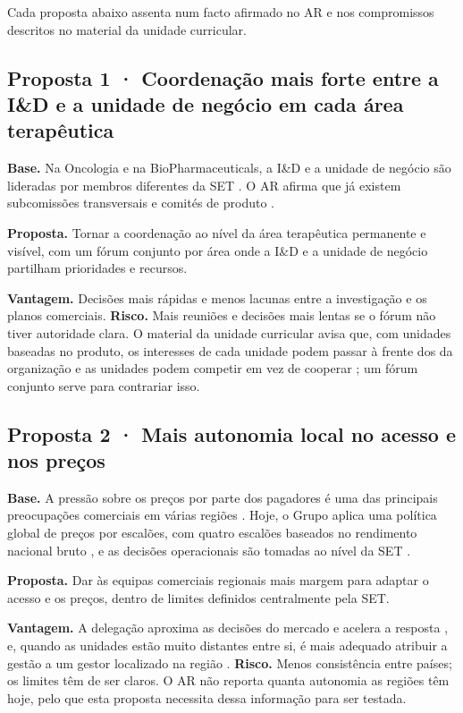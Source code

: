 Cada proposta abaixo assenta num facto afirmado no AR e nos compromissos descritos no material da unidade curricular.

\subsection{Proposta 1 · Coordenação mais forte entre a I\&D e a unidade de negócio em cada área terapêutica}

\textbf{Base.} Na Oncologia e na BioPharmaceuticals, a I\&D e a unidade de negócio são lideradas por membros diferentes da SET \cite[p.~70]{AR}. O AR afirma que já existem subcomissões transversais e comités de produto \cite[p.~147]{AR}.

\textbf{Proposta.} Tornar a coordenação ao nível da área terapêutica permanente e visível, com um fórum conjunto por área onde a I\&D e a unidade de negócio partilham prioridades e recursos.

\textbf{Vantagem.} Decisões mais rápidas e menos lacunas entre a investigação e os planos comerciais. \textbf{Risco.} Mais reuniões e decisões mais lentas se o fórum não tiver autoridade clara. O material da unidade curricular avisa que, com unidades baseadas no produto, os interesses de cada unidade podem passar à frente dos da organização e as unidades podem competir em vez de cooperar \cite[p.~17]{ORG}; um fórum conjunto serve para contrariar isso.

\subsection{Proposta 2 · Mais autonomia local no acesso e nos preços}

\textbf{Base.} A pressão sobre os preços por parte dos pagadores é uma das principais preocupações comerciais em várias regiões \cite[p.~32]{AR}. Hoje, o Grupo aplica uma política global de preços por escalões, com quatro escalões baseados no rendimento nacional bruto \cite[p.~41]{AR}, e as decisões operacionais são tomadas ao nível da SET \cite[p.~147]{AR}.

\textbf{Proposta.} Dar às equipas comerciais regionais mais margem para adaptar o acesso e os preços, dentro de limites definidos centralmente pela SET.

\textbf{Vantagem.} A delegação aproxima as decisões do mercado e acelera a resposta \cite[p.~7]{ORG}, e, quando as unidades estão muito distantes entre si, é mais adequado atribuir a gestão a um gestor localizado na região \cite[p.~17]{ORG}. \textbf{Risco.} Menos consistência entre países; os limites têm de ser claros. O AR não reporta quanta autonomia as regiões têm hoje, pelo que esta proposta necessita dessa informação para ser testada.
